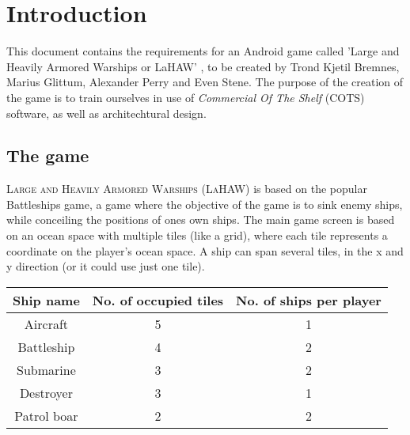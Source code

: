 \chapter{Introduction}
This document contains the requirements for an Android game called 'Large and Heavily Armored Warships or LaHAW' , to be created by Trond Kjetil Bremnes, Marius Glittum, Alexander Perry and Even Stene. The purpose of the creation of the game is to train ourselves in use of \emph{Commercial Of The Shelf} (COTS) software, as well as architechtural design.

\section{The game}
\textsc{Large and Heavily Armored Warships (LaHAW)} is based on the popular Battleships\cite{battleship} game, a game where the objective of the game is to sink enemy ships, while conceiling the positions of ones own ships. The main game screen is based on an ocean space with multiple tiles (like a grid), where each tile represents a coordinate on the player's ocean space. A ship can span several tiles, in the x and y direction (or it could use just one tile). 
\\


\begin{tabular}{| c | c | c |}
    \hline
    \rowcolor[gray]{0.8}
    \hspace{0.3cm}\textbf{Ship name}\hspace{0.3cm} & \textbf{No. of occupied tiles} & \textbf{No. of ships per player} \\
    \hline
    Aircraft & 5 & 1 \\
    Battleship & 4 & 2 \\
    Submarine & 3 & 2 \\
    Destroyer & 3 & 1 \\
    Patrol boar & 2 & 2 \\
    \hline
\end{tabular}
\label{shiptable}